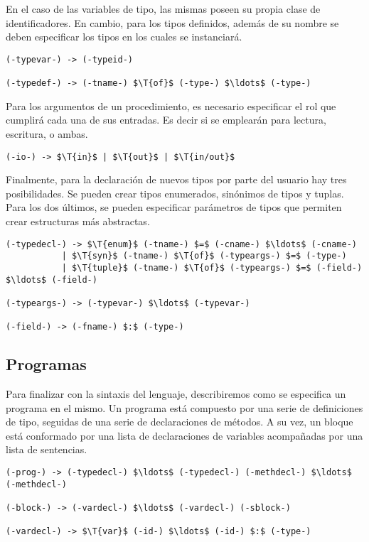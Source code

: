 \documentclass{article}
\begin{document}
En el caso de las variables de tipo, las mismas poseen su propia clase de identificadores.
En cambio, para los tipos definidos, además de su nombre se deben especificar los tipos en los cuales se instanciará.

\begin{lstlisting}[style = syntax]
(-typevar-) -> (-typeid-)

(-typedef-) -> (-tname-) $\T{of}$ (-type-) $\ldots$ (-type-)
\end{lstlisting}

Para los argumentos de un procedimiento, es necesario especificar el rol que cumplirá cada una de sus entradas.
Es decir si se emplearán para lectura, escritura, o ambas.

\begin{lstlisting}[style = syntax]
(-io-) -> $\T{in}$ | $\T{out}$ | $\T{in/out}$
\end{lstlisting}

Finalmente, para la declaración de nuevos tipos por parte del usuario hay tres posibilidades.
Se pueden crear tipos enumerados, sinónimos de tipos y tuplas.
Para los dos últimos, se pueden especificar parámetros de tipos que permiten crear estructuras más abstractas.

\begin{lstlisting}[style = syntax]
(-typedecl-) -> $\T{enum}$ (-tname-) $=$ (-cname-) $\ldots$ (-cname-)
           | $\T{syn}$ (-tname-) $\T{of}$ (-typeargs-) $=$ (-type-)
           | $\T{tuple}$ (-tname-) $\T{of}$ (-typeargs-) $=$ (-field-) $\ldots$ (-field-)

(-typeargs-) -> (-typevar-) $\ldots$ (-typevar-)

(-field-) -> (-fname-) $:$ (-type-)
\end{lstlisting}

\subsection{Programas}

Para finalizar con la sintaxis del lenguaje, describiremos como se especifica un programa en el mismo.
Un programa está compuesto por una serie de definiciones de tipo, seguidas de una serie de declaraciones de métodos.
A su vez, un bloque está conformado por una lista de declaraciones de variables acompañadas por una lista de sentencias.

\begin{lstlisting}[style = syntax]
(-prog-) -> (-typedecl-) $\ldots$ (-typedecl-) (-methdecl-) $\ldots$ (-methdecl-)

(-block-) -> (-vardecl-) $\ldots$ (-vardecl-) (-sblock-)

(-vardecl-) -> $\T{var}$ (-id-) $\ldots$ (-id-) $:$ (-type-)
\end{lstlisting}
\end{document}
